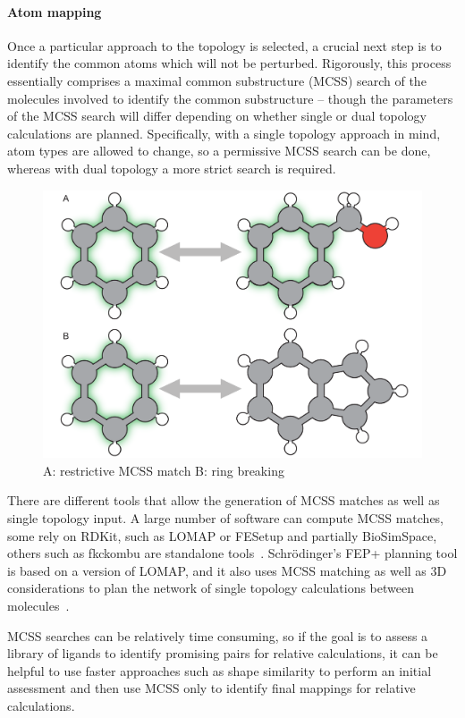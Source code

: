 \documentclass[9pt,bestpractices]{livecoms}
\begin{document}
\paragraph{Atom mapping}
Once a particular approach to the topology is selected, a crucial next step is to identify the common atoms which will not be perturbed.
Rigorously, this process essentially comprises a maximal common substructure (MCSS) search of the molecules involved to identify the common substructure -- though the parameters of the MCSS search will differ depending on whether single or dual topology calculations are planned.
Specifically, with a single topology approach in mind, atom types are allowed to change, so a permissive MCSS search can be done, whereas with dual topology a more strict search is required.
\begin{figure}[h!]
    \includegraphics[width=0.95\linewidth]{figures/fig4_mcs/Figure.pdf}
    \caption{A: restrictive MCSS match B: ring breaking}
    \label{fig:fig_mcss}
\end{figure} 

There are different tools that allow the generation of MCSS matches as well as single topology input. A large number of software can compute MCSS matches, some rely on RDKit, such as LOMAP or FESetup and partially BioSimSpace, others such as fkckombu are standalone tools~\cite{rdkit2019Dec, loeffler2015fesetup, liu2013lead, hedges2019biosimspace, kawabata20143d}. Schr\"{o}dinger's FEP+ planning tool is based on a version of LOMAP, and it also uses MCSS matching as well as 3D considerations to plan the network of single topology calculations between molecules~\cite{wang2015accurate}. 

MCSS searches can be relatively time consuming, so if the goal is to assess a library of ligands to identify promising pairs for relative calculations, it can be helpful to use faster approaches such as shape similarity to perform an initial assessment and then use MCSS only to identify final mappings for relative calculations.
\end{document}
